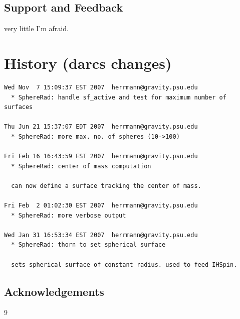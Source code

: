 \subsection{Support and Feedback}
very little I'm afraid.

\section{History (darcs changes)}
\begin{verbatim}
Wed Nov  7 15:09:37 EST 2007  herrmann@gravity.psu.edu
  * SphereRad: handle sf_active and test for maximum number of surfaces

Thu Jun 21 15:37:07 EDT 2007  herrmann@gravity.psu.edu
  * SphereRad: more max. no. of spheres (10->100)

Fri Feb 16 16:43:59 EST 2007  herrmann@gravity.psu.edu
  * SphereRad: center of mass computation

  can now define a surface tracking the center of mass.

Fri Feb  2 01:02:30 EST 2007  herrmann@gravity.psu.edu
  * SphereRad: more verbose output

Wed Jan 31 16:53:34 EST 2007  herrmann@gravity.psu.edu
  * SphereRad: thorn to set spherical surface

  sets spherical surface of constant radius. used to feed IHSpin.
\end{verbatim}

\subsection{Acknowledgements}


\begin{thebibliography}{9}

\end{thebibliography}



